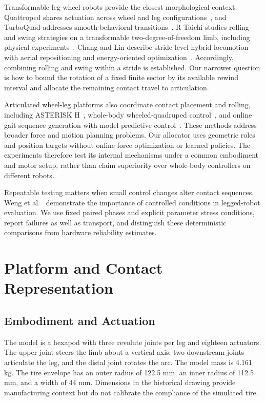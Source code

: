 \documentclass[letterpaper,10pt,conference]{ieeeconf}
\begin{document}
Transformable leg-wheel robots provide the closest morphological context. Quattroped shares actuation across wheel and leg configurations~\cite{chen2014quattroped}, and TurboQuad addresses smooth behavioral transitions~\cite{chen2017turboquad}. R-Taichi studies rolling and swing strategies on a transformable two-degree-of-freedom limb, including physical experiments~\cite{xue2025rolling}. Chang and Lin describe stride-level hybrid locomotion with aerial repositioning and energy-oriented optimization~\cite{chang2026stride}. Accordingly, combining rolling and swing within a stride is established. Our narrower question is how to bound the rotation of a fixed finite sector by its available rewind interval and allocate the remaining contact travel to articulation.

Articulated wheel-leg platforms also coordinate contact placement and rolling, including ASTERISK H~\cite{yoshioka2008asterisk}, whole-body wheeled-quadruped control~\cite{bjelonic2019keep}, and online gait-sequence generation with model predictive control~\cite{bjelonic2021wholebody}. These methods address broader force and motion planning problems. Our allocator uses geometric roles and position targets without online force optimization or learned policies. The experiments therefore test its internal mechanisms under a common embodiment and motor setup, rather than claim superiority over whole-body controllers on different robots.

Repeatable testing matters when small control changes alter contact sequences. Weng et al.~\cite{weng2024testing} demonstrate the importance of controlled conditions in legged-robot evaluation. We use fixed paired phases and explicit parameter stress conditions, report failures as well as transport, and distinguish these deterministic comparisons from hardware reliability estimates.

\section{Platform and Contact Representation}
\subsection{Embodiment and Actuation}
The model is a hexapod with three revolute joints per leg and eighteen actuators. The upper joint steers the limb about a vertical axis; two downstream joints articulate the leg, and the distal joint rotates the arc. The model mass is 4.161 kg. The tire envelope has an outer radius of 122.5 mm, an inner radius of 112.5 mm, and a width of 44 mm. Dimensions in the historical drawing provide manufacturing context but do not calibrate the compliance of the simulated tire.
\end{document}
